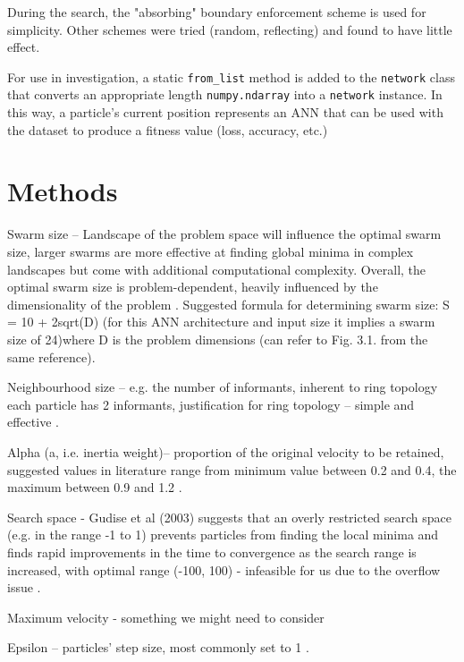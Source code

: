 \documentclass[12pt]{article}
\begin{document}
During the search, the "absorbing" \cite{Chu} boundary enforcement scheme is used
for simplicity. Other schemes were tried (random, reflecting) and found to have
little effect.

For use in investigation, a static \texttt{from\_list} method is added to
the \texttt{network} class that converts an appropriate length \texttt{numpy.ndarray}
into a \texttt{network} instance. In this way, a particle's current position
represents an ANN that can be used with the dataset to produce a fitness value (loss, accuracy, etc.)

\vspace{-1.5em}
\section{Methods}


Swarm size – Landscape of the problem space will influence the optimal swarm size, larger swarms are more effective at finding global minima in complex landscapes but come with additional computational complexity. Overall, the optimal swarm size is problem-dependent, heavily influenced by the dimensionality of the problem \cite{Razee}. Suggested formula for determining swarm size: S = 10 + 2sqrt(D) (for this ANN architecture and input size it implies a swarm size of 24)where D is the problem dimensions (can refer to Fig. 3.1. from the same reference)\cite{Clerc}.

Neighbourhood size – e.g. the number of informants, inherent to ring topology each particle has 2 informants, justification for ring topology – simple and effective \cite{Clerc}.

Alpha (a, i.e. inertia weight)– proportion of the original velocity to be retained, suggested values in literature range from minimum value between 0.2 and 0.4, the maximum between 0.9 and 1.2 \cite{Razee} \cite{Gudise}.

Search space - Gudise et al (2003) suggests that an overly restricted search space (e.g. in the range -1 to 1) prevents particles from finding the local minima and finds rapid improvements in the time to convergence as the search range is increased, with  optimal range (-100, 100) - infeasible for us due to the overflow issue \cite{Gudise}.

Maximum velocity - something we might need to consider

Epsilon – particles' step size, most commonly set to 1 \cite{Luke}.
\end{document}
